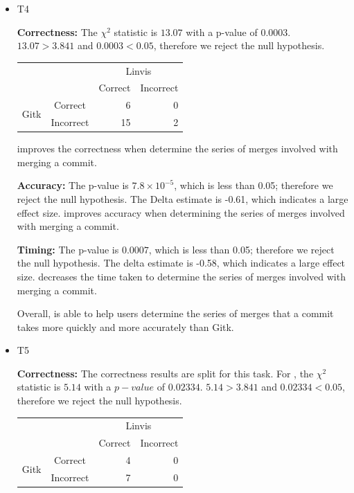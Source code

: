 \begin{itemize}
  \item T4

    \textbf{Correctness:}
    The $\chi^2$ statistic is $13.07$ with a p-value of $0.0003$.
    $13.07 > 3.841$ and $0.0003 < 0.05$, therefore we reject the null
    hypothesis.
    \vspace{2mm}
    \begin{tabular}{cc|rr}
                            &           & \multicolumn{2}{c}{Linvis}\\
                            &           & Correct                      & Incorrect\\\hline
      \multirow{2}{*}{Gitk} & Correct   & 6                            & 0\\
                            & Incorrect & 15                           & 2\\
    \end{tabular}
    \vspace{3mm}

    \tool improves the correctness when determine the series of merges
    involved with merging a commit.

    \textbf{Accuracy:} The p-value is $7.8 \times 10^{-5}$, which is
    less than 0.05; therefore we reject the null hypothesis. The Delta
    estimate is -0.61, which indicates a large effect size. \tool
    improves accuracy when determining the series of merges involved
    with merging a commit.

    \textbf{Timing:}
    The p-value is $0.0007$, which is less than 0.05; therefore we
    reject the null hypothesis. The delta estimate is -0.58, which
    indicates a large effect size. \tool decreases the time taken to
    determine the series of merges involved with merging a commit.

    Overall, \tool is able to help users determine the series of merges
    that a commit takes more quickly and more accurately than Gitk.

  \item T5

    \textbf{Correctness:}
    The correctness results are split for this task. For \comA, the
    $\chi^2$ statistic is $5.14$ with a $p-value$ of $0.02334$. $5.14 >
    3.841$ and $0.02334 < 0.05$, therefore we reject the null
    hypothesis.
    \vspace{2mm}
    \begin{tabular}{cc|rr}
                             &           & \multicolumn{2}{c}{Linvis}\\
                             &           & Correct                      & Incorrect\\\hline
      \multirow{2}{*}{Gitk}  & Correct   & 4                            & 0\\
                             & Incorrect & 7                            & 0\\
    \end{tabular}
    \vspace{3mm}


\end{itemize}
